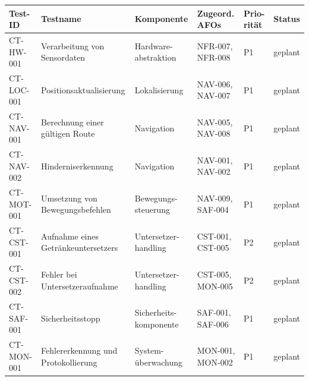 \begin{longtable}[]{@{}
  >{\raggedright\arraybackslash}p{}
  >{\raggedright\arraybackslash}p{}
  >{\raggedright\arraybackslash}p{}
  >{\raggedright\arraybackslash}p{}
  >{\raggedright\arraybackslash}p{}
  >{\raggedright\arraybackslash}p{}@{}}
\toprule\noalign{}
\begin{minipage}[b]{\linewidth}\raggedright
Test-ID
\end{minipage} & \begin{minipage}[b]{\linewidth}\raggedright
Testname
\end{minipage} & \begin{minipage}[b]{\linewidth}\raggedright
Komponente
\end{minipage} & \begin{minipage}[b]{\linewidth}\raggedright
Zugeord. AFOs
\end{minipage} & \begin{minipage}[b]{\linewidth}\raggedright
Prio-rität
\end{minipage} & \begin{minipage}[b]{\linewidth}\raggedright
Status
\end{minipage} \\
\midrule\noalign{}
\endhead
\bottomrule\noalign{}
\endlastfoot
CT-HW-001 & Verarbeitung von Sensordaten & Hardware-abstraktion &
NFR-007, NFR-008 & P1 & geplant \\
CT-LOC-001 & Positionsaktualisierung & Lokalisierung & NAV-006, NAV-007
& P1 & geplant \\
CT-NAV-001 & Berechnung einer gültigen Route & Navigation & NAV-005,
NAV-008 & P1 & geplant \\
CT-NAV-002 & Hinderniserkennung & Navigation & NAV-001, NAV-002 & P1 &
geplant \\
CT-MOT-001 & Umsetzung von Bewegungsbefehlen & Bewegungs-steuerung &
NAV-009, SAF-004 & P1 & geplant \\
CT-CST-001 & Aufnahme eines Getränkeuntersetzers & Untersetzer-handling
& CST-001, CST-005 & P2 & geplant \\
CT-CST-002 & Fehler bei Untersetzeraufnahme & Untersetzer-handling &
CST-005, MON-005 & P2 & geplant \\
CT-SAF-001 & Sicherheitsstopp & Sicherheits-komponente & SAF-001,
SAF-006 & P1 & geplant \\
CT-MON-001 & Fehlererkennung und Protokollierung & System-überwachung &
MON-001, MON-002 & P1 & geplant \\
\end{longtable}

